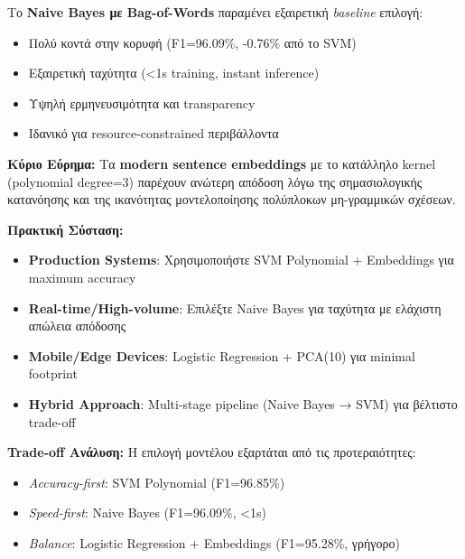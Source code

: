 \documentclass[12pt,a4paper,twoside]{book}
\begin{document}
Το \textbf{Naive Bayes με Bag-of-Words} παραμένει εξαιρετική \textit{baseline} επιλογή:
\begin{itemize}
    \item \checkmark Πολύ κοντά στην κορυφή (F1=96.09\%, -0.76\% από το SVM)
    \item \checkmark Εξαιρετική ταχύτητα (<1s training, instant inference)
    \item \checkmark Υψηλή ερμηνευσιμότητα και transparency
    \item \checkmark Ιδανικό για resource-constrained περιβάλλοντα
\end{itemize}

\textbf{Κύριο Εύρημα:} Τα \textbf{modern sentence embeddings} με το κατάλληλο kernel (polynomial degree=3) παρέχουν ανώτερη απόδοση λόγω της σημασιολογικής κατανόησης και της ικανότητας μοντελοποίησης πολύπλοκων μη-γραμμικών σχέσεων.

\textbf{Πρακτική Σύσταση:}
\begin{itemize}
    \item \textbf{Production Systems}: Χρησιμοποιήστε SVM Polynomial + Embeddings για maximum accuracy
    \item \textbf{Real-time/High-volume}: Επιλέξτε Naive Bayes για ταχύτητα με ελάχιστη απώλεια απόδοσης
    \item \textbf{Mobile/Edge Devices}: Logistic Regression + PCA(10) για minimal footprint
    \item \textbf{Hybrid Approach}: Multi-stage pipeline (Naive Bayes → SVM) για βέλτιστο trade-off
\end{itemize}

\textbf{Trade-off Ανάλυση:} Η επιλογή μοντέλου εξαρτάται από τις προτεραιότητες:
\begin{itemize}
    \item \textit{Accuracy-first}: SVM Polynomial (F1=96.85\%)
    \item \textit{Speed-first}: Naive Bayes (F1=96.09\%, <1s)
    \item \textit{Balance}: Logistic Regression + Embeddings (F1=95.28\%, γρήγορο)
\end{itemize}



\end{document}
